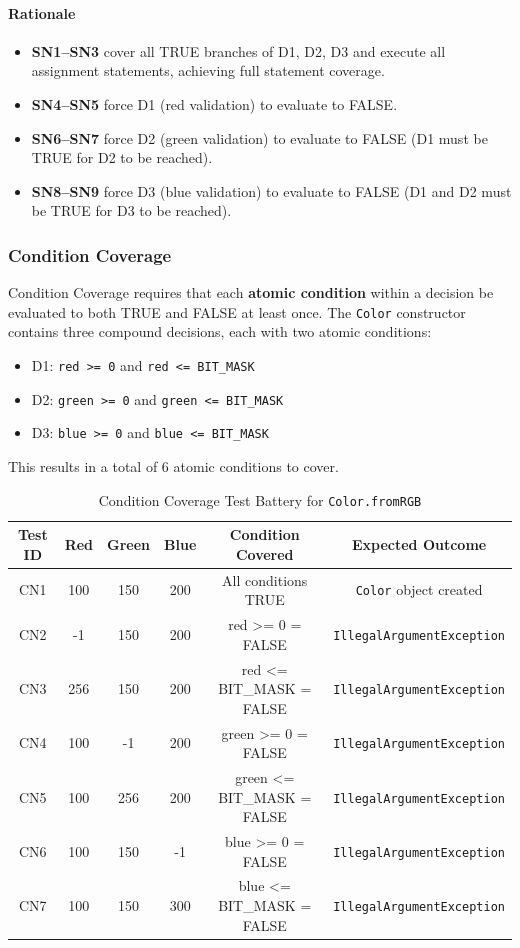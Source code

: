 \documentclass[11pt, a4paper]{article}
\begin{document}
\paragraph{Rationale}
\begin{itemize}
    \item \textbf{SN1--SN3} cover all TRUE branches of D1, D2, D3 and execute all assignment statements, achieving full statement coverage.
    \item \textbf{SN4--SN5} force D1 (red validation) to evaluate to FALSE.
    \item \textbf{SN6--SN7} force D2 (green validation) to evaluate to FALSE (D1 must be TRUE for D2 to be reached).
    \item \textbf{SN8--SN9} force D3 (blue validation) to evaluate to FALSE (D1 and D2 must be TRUE for D3 to be reached).
\end{itemize}

\subsubsection{Condition Coverage}
Condition Coverage requires that each \textbf{atomic condition} within a decision be evaluated to both TRUE and FALSE at least once. The \texttt{Color} constructor contains three compound decisions, each with two atomic conditions:
\begin{itemize}
    \item D1: \texttt{red >= 0} and \texttt{red <= BIT\_MASK}
    \item D2: \texttt{green >= 0} and \texttt{green <= BIT\_MASK}
    \item D3: \texttt{blue >= 0} and \texttt{blue <= BIT\_MASK}
\end{itemize}
This results in a total of 6 atomic conditions to cover.

\begin{table}[H]
\centering
\caption{Condition Coverage Test Battery for \texttt{Color.fromRGB}}
\label{tab:color_condition_coverage}
\begin{tabular}{cccccc}
\toprule
\textbf{Test ID} & \textbf{Red} & \textbf{Green} & \textbf{Blue} & \textbf{Condition Covered} & \textbf{Expected Outcome} \\
\midrule
CN1 & 100 & 150 & 200 & All conditions TRUE & \texttt{Color} object created \\
CN2 & -1 & 150 & 200 & red >= 0 = FALSE & \texttt{IllegalArgumentException} \\
CN3 & 256 & 150 & 200 & red <= BIT\_MASK = FALSE & \texttt{IllegalArgumentException} \\
CN4 & 100 & -1 & 200 & green >= 0 = FALSE & \texttt{IllegalArgumentException} \\
CN5 & 100 & 256 & 200 & green <= BIT\_MASK = FALSE & \texttt{IllegalArgumentException} \\
CN6 & 100 & 150 & -1 & blue >= 0 = FALSE & \texttt{IllegalArgumentException} \\
CN7 & 100 & 150 & 300 & blue <= BIT\_MASK = FALSE & \texttt{IllegalArgumentException} \\
\bottomrule
\end{tabular}
\end{table}
\end{document}
